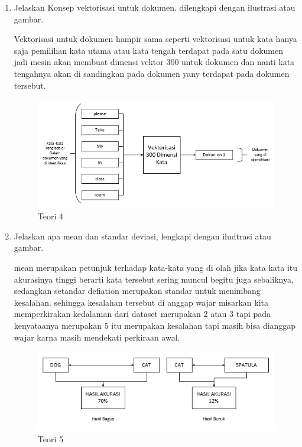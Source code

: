\begin{enumerate}
\item Jelaskan Konsep vektorisasi untuk dokumen. dilengkapi dengan ilustrasi atau gambar. \par
Vektorisasi untuk dokumen hampir sama seperti vektorisasi untuk kata hanya saja pemilihan kata utama atau kata tengah terdapat pada satu dokumen jadi mesin akan membuat dimensi vektor 300 untuk dokumen dan nanti kata tengahnya akan di sandingkan pada dokumen yany terdapat pada dokumen tersebut.

\begin{figure}[ht]
\centering
\includegraphics[scale=0.6]{figures/1174042/chapter5/1,4.PNG}
\caption{Teori 4}
\label{contoh}
\end{figure}

\item Jelaskan apa mean dan standar deviasi, lengkapi dengan iludtrasi atau gambar. \par
mean merupakan petunjuk terhadap kata-kata yang di olah jika kata kata itu akurasinya tinggi berarti kata tersebut sering muncul begitu juga sebaliknya, sedangkan setandar defiation merupakan standar untuk menimbang kesalahan. sehingga kesalahan tersebut di anggap wajar misarkan kita memperkirakan kedalaman dari dataset merupakan 2 atau 3 tapi pada kenyataanya merupakan 5 itu merupakan kesalahan tapi masih bisa dianggap wajar karna masih mendekati perkiraan awal.

\begin{figure}[ht]
\centering
\includegraphics[scale=0.6]{figures/1174042/chapter5/1,5.PNG}
\caption{Teori 5}
\label{contoh}
\end{figure}


\end{enumerate}
